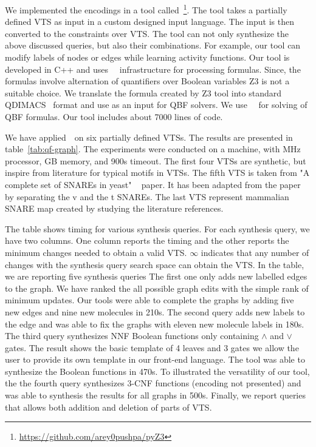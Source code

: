 We implemented the encodings in a tool
called~\ourtool\footnote{{\url{https://github.com/arey0pushpa/pyZ3}}}.
%
The tool takes a partially defined VTS as input in a custom designed
input language.
%
The input is then converted to the constraints over VTS. 
%
The tool can not only synthesize the above discussed queries, but also their
combinations.
%
For example, our tool can modify labels of nodes or edges while
learning activity functions.
%
Our tool is developed in C++ and uses~\zthree~\cite{z3} infrastructure for
processing formulas. 
%
Since, the formulas involve alternation of quantifiers over Boolean
variables Z3 is not a suitable choice.
%
We translate the formula created by Z3 tool into standard
QDIMACS~\cite{qdimacs} format and use as an input for QBF solvers. 
%
We use~\depqbf~\cite{lonsing2010depqbf} for solving of QBF formulas. 
%
Our tool includes about 7000 lines of code.

We have applied~\ourtool~on six partially defined VTSs.
%
The results are presented in table~\ref{tab:qf-graph}.
%
The experiments were conducted on a machine,
with MHz processor, GB memory, and 900s timeout.
%
The first four VTSs are synthetic, but inspire from literature for
typical motifs in VTSs. 
%
%
The fifth VTS is taken from "A complete set of SNAREs in yeast"
~\cite{burri2004complete} paper. It has been adapted from the paper by
separating the v and the t SNAREs. 
%
The last VTS represent mammalian SNARE map created by studying the literature references.  

The table shows timing for various synthesis queries.
%
For each synthesis query, we have two columns.
%
One column reports the timing and the other reports the minimum changes
needed to obtain a valid VTS.
%
$\infty$ indicates that any number of changes with the synthesis query
search space can obtain the VTS.
%
In the table, we are reporting five synthesis queries
%
The first one only adds new labelled edges to the graph.
%
We have ranked the all possible graph edits with the simple rank of
minimum updates.
%
Our tools were able to complete the graphs by adding five new edges
and nine new molecules in 210s.
%
The second query adds new labels to the edge and was able to
fix the graphs with eleven new molecule labels in 180s.
%
The third query synthesizes NNF Boolean functions only containing
$\land$ and $\lor$ gates.
%
The result shows the basic template of 4 leaves and 3 gates we allow
the user to provide its own template in our front-end language.
%
The tool was able to synthesize the Boolean functions in 470s.
%
To illustrated the versatility of our tool,
the the fourth query synthesizes $3$-CNF functions (encoding not presented) and was able
to synthesis the results for all graphs in 500s.
%
Finally, we report queries that allows both addition and deletion of parts of
VTS. 
%
%



